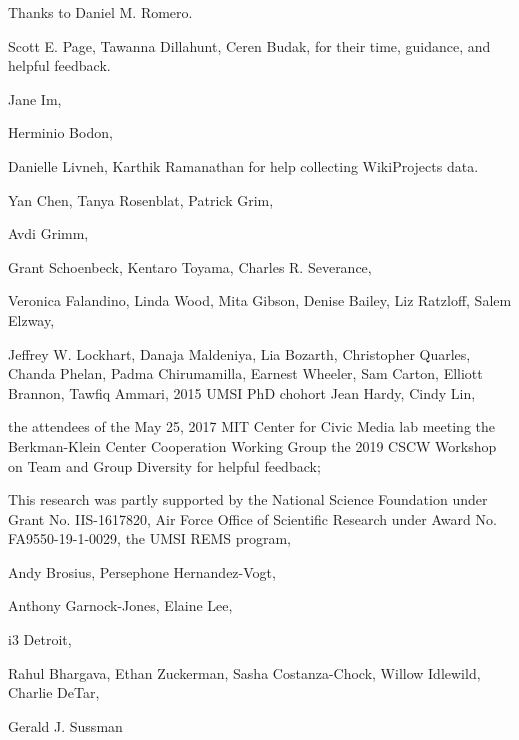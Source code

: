 Thanks to Daniel M. Romero.


Scott E. Page,
Tawanna Dillahunt,
Ceren Budak,
for their time, guidance, and helpful feedback.

Jane Im,

Herminio Bodon,

Danielle Livneh,
Karthik Ramanathan
for help collecting WikiProjects data.

Yan Chen,
Tanya Rosenblat,
Patrick Grim,

Avdi Grimm,

Grant Schoenbeck,
Kentaro Toyama,
Charles R. Severance,

Veronica Falandino,
Linda Wood,
Mita Gibson,
Denise Bailey,
Liz Ratzloff,
Salem Elzway,

Jeffrey W. Lockhart,
Danaja Maldeniya,
Lia Bozarth,
Christopher Quarles,
Chanda Phelan,
Padma Chirumamilla,
Earnest Wheeler,
Sam Carton,
Elliott Brannon,
Tawfiq Ammari,
2015 UMSI PhD chohort
Jean Hardy,
Cindy Lin,

the attendees of the May 25, 2017 MIT Center for Civic Media lab meeting
the Berkman-Klein Center Cooperation Working Group
the 2019 CSCW Workshop on Team and Group Diversity
for helpful feedback;

This research was partly supported by
the National Science Foundation under Grant No. IIS-1617820,
Air Force Office of Scientific Research under Award No. FA9550-19-1-0029,
the UMSI REMS program,

Andy Brosius,
Persephone Hernandez-Vogt,

Anthony Garnock-Jones,
Elaine Lee,

i3 Detroit,

Rahul Bhargava,
Ethan Zuckerman,
Sasha Costanza-Chock,
Willow Idlewild,
Charlie DeTar,

Gerald J. Sussman